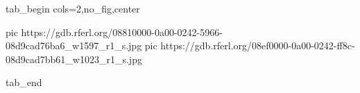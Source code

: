  
 
 
 
 


\ifcmt
  tab_begin cols=2,no_fig,center

     pic https://gdb.rferl.org/08810000-0a00-0242-5966-08d9cad76ba6_w1597_r1_s.jpg
		 pic https://gdb.rferl.org/08ef0000-0a00-0242-ff8c-08d9cad7bb61_w1023_r1_s.jpg

  tab_end
\fi
